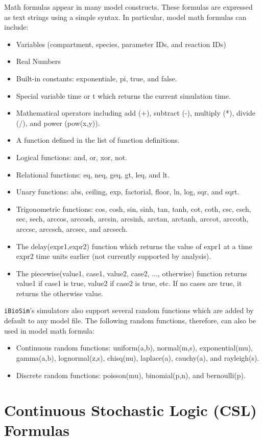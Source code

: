 \documentclass[titlepage,11pt]{article}
\begin{document}
\noindent
Math formulas appear in many model constructs.  These formulas are expressed as text strings using a simple syntax.  In particular, model math formulas can include: 
\begin{itemize}
\item Variables (compartment, species, parameter IDs, and reaction IDs)
\item Real Numbers
\item Built-in constants: exponentiale, pi, true, and false.
\item Special variable time or t which returns the current simulation time.
\item Mathematical operators including add (+), subtract (-), multiply (*), divide (/), and power (pow(x,y)).
\item A function defined in the list of function definitions.
\item Logical functions: and, or, xor, not.
\item Relational functions: eq, neq, geq, gt, leq, and lt.
\item Unary functions: abs, ceiling, exp, factorial, floor, ln, log, sqr, and sqrt.
\item Trigonometric functions: cos, cosh, sin, sinh, tan, tanh, cot, coth, csc, csch, sec, sech, arccos, arccosh, arcsin, arcsinh, arctan, arctanh, arccot, arccoth, arccsc, arccsch, arcsec, and arcsech.
\item The delay(expr1,expr2) function which returns the value of expr1 at a time expr2 time units earlier (not currently supported by analysis).
\item The piecewise(value1, case1, value2, case2, ..., otherwise) function returns value1 if case1 is true, value2 if case2 is true, etc.  If no cases are true, it returns the otherwise value.
\end{itemize}

{\tt iBioSim}'s simulators also support several random functions which are added by default to any model file.  The following random functions, therefore, can also be used in model math formula:
\begin{itemize}
\item Continuous random functions: uniform(a,b), normal(m,s), exponential(mu), gamma(a,b), lognormal(z,s), chisq(nu), laplace(a), cauchy(a), and rayleigh(s).
\item Discrete random functions: poisson(mu), binomial(p,n), and bernoulli(p).
\end{itemize}

\section{\label{CSL}Continuous Stochastic Logic (CSL) Formulas}
\end{document}
